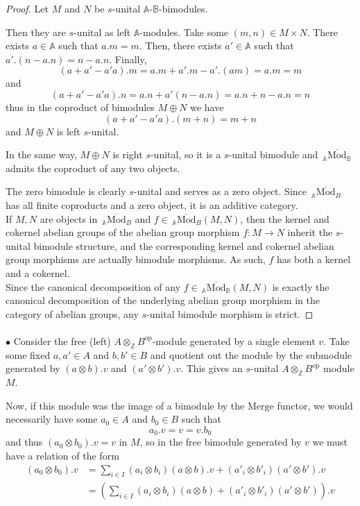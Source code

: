 \documentclass[a4paper,fleqn]{cas-sc}
\newcommand{\bA}{\mathbb{A}}
\newcommand{\bB}{\mathbb{B}}
\newcommand{\smod}{\overline{\mathrm{Mod}}}
\newcommand{\merg}{\mathrm{Merge}}
\begin{document}
\begin{proof}
Let $M$ and $N$ be $s$-unital $\bA$-$\bB$-bimodules.

Then they are $s$-unital as left $\bA$-modules. Take some $(m,n) \in M \times N$. There exists $a \in \bA$ such that $a.m = m$. Then, there exists $a' \in \bA$ such that $a'.(n-a.n) = n - a.n$. Finally, 
\[
(a+a'-a'a).m = a.m + a'.m - a'.(am) = a.m = m
\]
and
\[
(a+a'-a'a).n = a.n + a'(n-a.n) = a.n + n - a.n = n
\]
thus in the coproduct of bimodules $M \oplus N$ we have 
\[(a+a'-a'a).(m+n) = m + n\]
and $M \oplus N$ is left $s$-unital. 

In the same way, $M \oplus N$ is right $s$-unital, so it is a $s$-unital bimodule and $\,_\bA\smod_\bB$ admits the coproduct of any two objects.


The zero bimodule is clearly $s$-unital and serves as a zero object. Since $\,_\bA\smod_B$ has all finite coproducts and a zero object, it is an additive category.\\

If $M,N$ are objects in  $\,_\bA\smod_B$ and $f \in  \,_\bA\smod_B (M,N)$, then the kernel and cokernel abelian groups of the abelian group morphism $f: M \to N$ inherit the $s$-unital bimodule structure, and the corresponding kernel and cokernel abelian group morphisms are actually bimodule morphisms. As such, $f$ has both a kernel and a cokernel.\\

Since the canonical decomposition of any $f \in \,_\bA\smod_\bB (M,N)$ is exactly the canonical decomposition of the underlying abelian group morphism in the category of abelian groups, any $s$-unital bimodule morphism is strict.
\end{proof}

\iffalse
\paragraph{} $\bullet$ Consider the free (left) $A \otimes_{\mathbb{Z}} B^{\text{op}}$-module generated by a single element $v$. Take some fixed $a,a' \in A$ and $b, b' \in B$ and quotient out the module by the submodule generated by $(a \otimes b) . v$ and $(a' \otimes b') . v$. This gives an $s$-unital $A \otimes_{\mathbb{Z}} B^{\text{op}}$ module $M$.

Now, if this module was the image of a bimodule by the $\merg$ functor, we would necessarily have some $a_0 \in A$ and $b_0 \in B$ such that 
\[
a_0.v = v = v.b_0
\]
and thus $(a_0 \otimes b_0).v = v$ in $M$, so in the free bimodule generated by $v$ we must have a relation of the form
\begin{align*}
(a_0 \otimes b_0).v
&=
\sum_{i \in I} (a_i \otimes b_i) (a \otimes b).v
+(a'_i \otimes b'_i) (a' \otimes b').v\\
&= \left( 
\sum_{i \in I} (a_i \otimes b_i) (a \otimes b)
+(a'_i \otimes b'_i) (a' \otimes b')
\right).v    
\end{align*}
\end{document}
